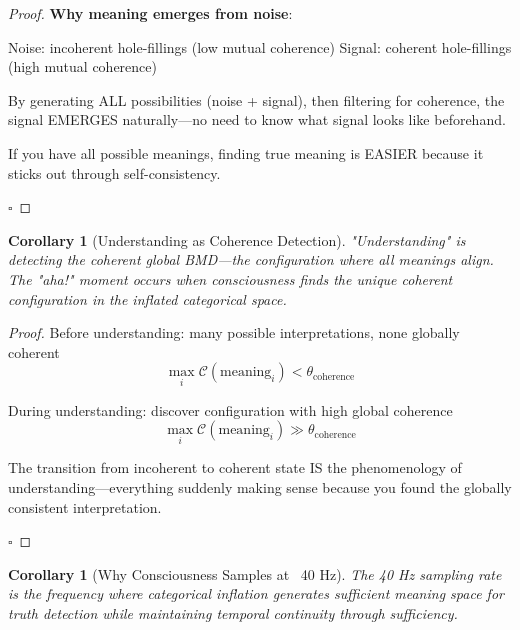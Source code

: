 \documentclass[11pt,a4paper]{article}
\newtheorem{corollary}[theorem]{Corollary}
\begin{document}
\begin{proof}
\textbf{Why meaning emerges from noise}:

Noise: incoherent hole-fillings (low mutual coherence)
Signal: coherent hole-fillings (high mutual coherence)

By generating ALL possibilities (noise + signal), then filtering for coherence, the signal EMERGES naturally—no need to know what signal looks like beforehand.

If you have all possible meanings, finding true meaning is EASIER because it sticks out through self-consistency.

$\square$
\end{proof}

\begin{corollary}[Understanding as Coherence Detection]
\label{cor:understanding_coherence}
"Understanding" is detecting the coherent global BMD—the configuration where all meanings align. The "aha!" moment occurs when consciousness finds the unique coherent configuration in the inflated categorical space.
\end{corollary}

\begin{proof}
Before understanding: many possible interpretations, none globally coherent
\begin{equation}
\max_i \mathcal{C}(\text{meaning}_i) < \theta_{\text{coherence}}
\end{equation}

During understanding: discover configuration with high global coherence
\begin{equation}
\max_i \mathcal{C}(\text{meaning}_i) \gg \theta_{\text{coherence}}
\end{equation}

The transition from incoherent to coherent state IS the phenomenology of understanding—everything suddenly making sense because you found the globally consistent interpretation.

$\square$
\end{proof}

\begin{corollary}[Why Consciousness Samples at ~40 Hz]
The 40 Hz sampling rate is the frequency where categorical inflation generates sufficient meaning space for truth detection while maintaining temporal continuity through sufficiency.
\end{corollary}
\end{document}
